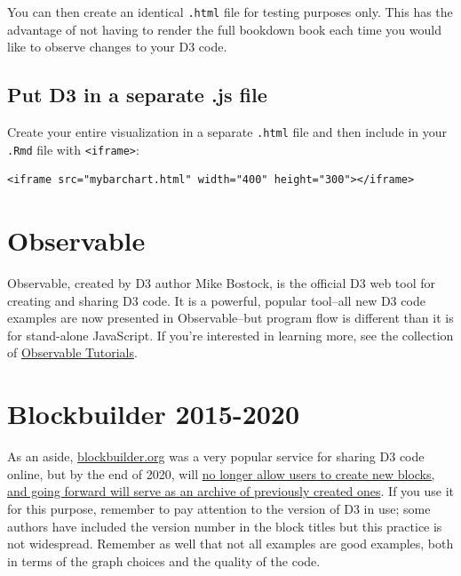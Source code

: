 \documentclass[
  openany]{book}
\begin{document}
You can then create an identical \texttt{.html} file for testing purposes only. This has the advantage of not having to render the full bookdown book each time you would like to observe changes to your D3 code.

\hypertarget{put-d3-in-a-separate-.js-file-1}{%
\subsection{Put D3 in a separate .js file}\label{put-d3-in-a-separate-.js-file-1}}

Create your entire visualization in a separate \texttt{.html} file and then include in your \texttt{.Rmd} file with \texttt{\textless{}iframe\textgreater{}}:

\begin{verbatim}
<iframe src="mybarchart.html" width="400" height="300"></iframe>
\end{verbatim}

\hypertarget{observable}{%
\section{Observable}\label{observable}}

Observable, created by D3 author Mike Bostock, is the official D3 web tool for creating and sharing D3 code. It is a powerful, popular tool--all new D3 code examples are now presented in Observable--but program flow is different than it is for stand-alone JavaScript. If you're interested in learning more, see the collection of \href{https://observablehq.com/tutorials}{Observable Tutorials}.

\hypertarget{blockbuilder-2015-2020}{%
\section{Blockbuilder 2015-2020}\label{blockbuilder-2015-2020}}

As an aside, \href{https://blockbuilder.org/}{blockbuilder.org} was a very popular service for sharing D3 code online, but by the end of 2020, will \href{https://bl.ocks.org/enjalot/1ef61f8c72ddccc99707d36a85f0eba7}{no longer allow users to create new blocks, and going forward will serve as an archive of previously created ones}. If you use it for this purpose, remember to pay attention to the version of D3 in use; some authors have included the version number in the block titles but this practice is not widespread. Remember as well that not all examples are good examples, both in terms of the graph choices and the quality of the code.
\end{document}
